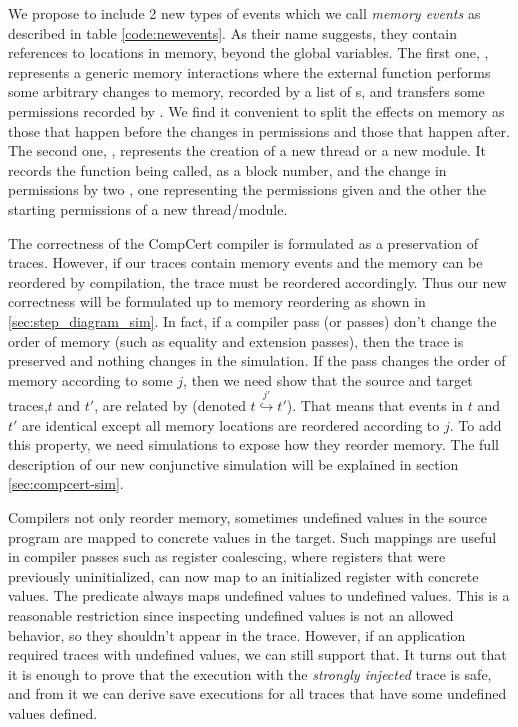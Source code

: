 We propose to include 2 new types of events which we call \emph{memory events} as described in table \ref{code:newevents}. As their name suggests, they contain references to locations in memory, beyond the global variables.  
The first one, , represents a generic memory interactions where the external function performs some arbitrary changes to memory, recorded by a list of s, and transfers some permissions recorded by . We find it convenient to split the effects on memory as those that happen before the changes in permissions and those that happen after. 
The second one,  , represents the creation of a new thread or a new module. It records the function being called, as a block number, and the change in permissions by two , one representing the permissions given and the other the starting permissions of a new thread/module.

The correctness of the CompCert compiler is formulated as a preservation of traces. However, if our traces contain memory events and the memory can be reordered by compilation, the trace must be reordered accordingly. Thus our new correctness will be formulated up to memory reordering as shown in \ref{sec:step_diagram_sim}. In fact, if a compiler pass (or passes) don't change the order of memory (such as equality and extension passes), then the trace is preserved and nothing changes in the simulation. If the pass changes the order of memory according to some $j$, then we need show that the source and target traces,$t$ and $t'$, are related by  (denoted $t \overset{j'}{\hookrightarrow} t'$). That means that events in $t$ and $t'$ are identical except all memory locations are reordered according to $j$. To add this property, we need simulations to expose how they reorder memory. The full description of our new conjunctive simulation will be explained in section \ref{sec:compcert-sim}.


Compilers not only reorder memory, sometimes undefined values in the source program are mapped to concrete values in the target. Such mappings are useful in compiler passes such as register coalescing, where registers that were previously uninitialized, can now map to an initialized register with concrete values. The predicate  always maps undefined values to undefined values. This is a reasonable restriction since inspecting undefined values is not an allowed behavior, so they shouldn't appear in the trace. However, if an application required traces with undefined values, we can still support that. It turns out that it is enough to prove that the execution with the \emph{strongly injected} trace is safe, and from it we can derive save executions for all traces that have some undefined values defined.
